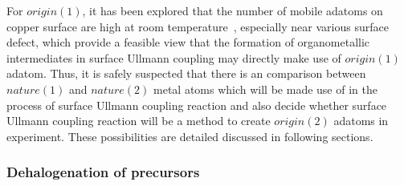 \documentclass[%
 reprint,
 amsmath,amssymb,
 aps,
prb,
]{revtex4-2}
\begin{document}
For $origin(1)$, it has been explored that the number of mobile adatoms on copper surface are high at room temperature~\cite{ullmann_58}, especially near various surface defect, which provide a feasible view that the formation of organometallic intermediates in surface Ullmann coupling may directly make use of $origin(1)$ adatom. Thus, it is safely suspected that there is an comparison between $nature(1)$ and $nature(2)$ metal atoms which will be made use of in the process of surface Ullmann coupling reaction and also decide whether surface Ullmann coupling reaction will be a method to create $origin(2)$ adatoms in experiment. These possibilities are detailed discussed in following sections.






\subsubsection{\label{sec:level3}Dehalogenation of precursors}
\end{document}
